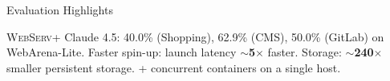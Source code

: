 \documentclass[scheme=plain,aspectratio=169]{beamer}
\DeclareRobustCommand{\projectname}{\textsc{WebServ}\xspace}
\begin{document}




\begin{frame}{Evaluation Highlights}
  \begin{outline}
    \1 \projectname + Claude 4.5: 40.0\% (Shopping), 62.9\% (CMS), 50.0\% (GitLab) on WebArena-Lite.
    \1 Faster spin-up: launch latency \textbf{$\sim$5$\times$} faster.
    \1 Storage: \textbf{$\sim$240$\times$} smaller persistent storage.
    + concurrent containers on a single host.
  \end{outline}
\end{frame}
\end{document}
